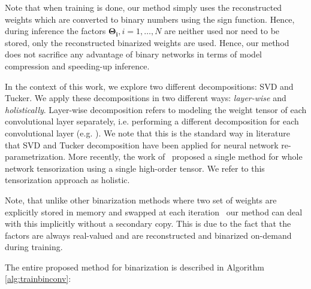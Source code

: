 \documentclass[10pt,twocolumn,letterpaper]{article}
\newcommand{\mymatrix}[1]{\ensuremath{\mathbf{#1}}}
\begin{document}
Note that when training is done, our method simply uses the  reconstructed weights which are converted to binary numbers using the sign function. Hence, during inference the factors $\mymatrix{\Theta_i}, i=1, \dots, N$ are neither used nor need to be stored, only the reconstructed binarized weights are used. Hence, our method does not sacrifice any advantage of binary networks in terms of model compression and speeding-up inference.

In the context of this work, we explore two different decompositions: SVD and Tucker. We apply these decompositions in two different ways: \textit{layer-wise} and \textit{holistically}. Layer-wise decomposition refers to modeling the weight tensor of each convolutional layer separately, i.e. performing a different decomposition for each convolutional layer (e.g. \cite{lebedev2014speeding, yong2015compression, tai2015convolutional}). We note that this is the standard way in literature that SVD and Tucker decomposition have been applied for neural network re-parametrization.  More recently, the work of~\cite{kossaifi2018parametrizing} proposed a single method for whole network tensorization using a single high-order tensor. We refer to this tensorization approach as holistic.

Note, that unlike other binarization methods where two set of weights are explicitly stored in memory and swapped at each iteration~\cite{rastegari2016xnor} our method can deal with this implicitly without a secondary copy. This is due to the fact that the factors are always real-valued and are reconstructed and binarized on-demand during training.

The entire proposed method for binarization is described in Algorithm \ref{alg:trainbinconv}:
\end{document}
